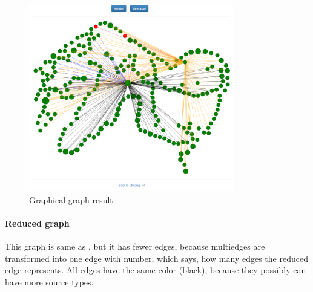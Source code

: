 \documentclass[12pt,a4paper]{article}
\begin{document}
\begin{figure}[H]
    \centering
    \includegraphics[width=0.8\textwidth]{pictures/graphical.png}
		\caption{Graphical graph result}
		\label{fig:graphical}
\end{figure}

\paragraph{Reduced graph}
This graph is same as , but it has fewer edges, because multiedges are transformed into one edge with number, which says, how many edges the reduced edge represents. All edges have the same color (black), because they possibly can have more source types.
\end{document}
